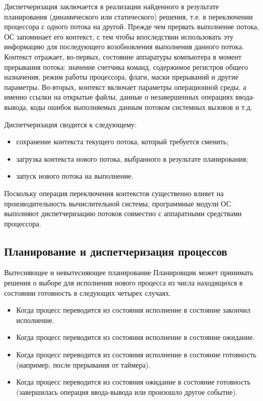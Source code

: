 Диспетчеризация заключается в реализации найденного в результате планирования (динамического или статического) решения, т.е. в переключении процессора с одного потока на другой. Прежде чем прервать выполнение потока, ОС запоминает его контекст, с тем чтобы впоследствии использовать эту информацию для последующего возобновления выполнения данного потока. Контекст отражает, во-первых, состояние аппаратуры компьютера в момент прерывания потока: значение счетчика команд, содержимое регистров общего назначения, режим работы процессора, флаги, маски прерываний и другие параметры. Во-вторых, контекст включает параметры операционной среды, а именно ссылки на открытые файлы, данные о незавершенных операциях ввода- вывода, коды ошибок выполняемых данным потоком системных вызовов и т.д.

Диспетчеризация сводится к следующему:
\begin{itemize}
   \item сохранение контекста текущего потока, который требуется сменить;
   \item загрузка контекста нового потока, выбранного в результате планирования;
   \item запуск нового потока на выполнение.
\end{itemize}

Поскольку операция переключения контекстов существенно влияет на производительность вычислительной системы, программные модули ОС выполняют диспетчеризацию потоков совместно с аппаратными средствами процессора.
\newpage
\subsection{Планирование и диспетчеризация процессов}

Вытесняющее и невытесняющее планирование
Планировщик может принимать решения о выборе для исполнения нового процесса из числа находящихся в состоянии готовность в следующих четырех случаях.

\begin{itemize}
   \item Когда процесс переводится из состояния исполнение в состояние закончил исполнение.
   \item Когда процесс переводится из состояния исполнение в состояние ожидание.
   \item Когда процесс переводится из состояния исполнение в состояние готовность (например, после прерывания от таймера).
   \item  Когда процесс переводится из состояния ожидание в состояние готовность (завершилась операция ввода-вывода или произошло другое событие).
\end{itemize}

